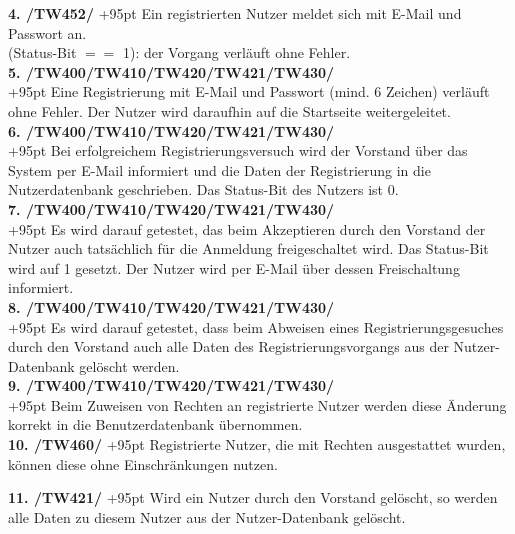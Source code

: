 \documentclass[fontsize = 12pt, paper = a4]{scrreprt}
\begin{document}
\textbf{4. /TW452/}
\hangindent+95pt 
\hspace*{5.5mm}
Ein registrierten Nutzer meldet sich mit E-Mail und Passwort an.\\ (Status-Bit $==$ 1): der Vorgang verläuft ohne Fehler.\\
 
\textbf{5. /TW400/TW410/TW420/TW421/TW430/}\\
\hangindent+95pt 
Eine Registrierung mit E-Mail und Passwort (mind. 6 Zeichen) verläuft ohne Fehler. Der Nutzer wird daraufhin auf die Startseite weitergeleitet.\\

\textbf{6. /TW400/TW410/TW420/TW421/TW430/}\\
\hangindent+95pt 
Bei erfolgreichem Registrierungsversuch wird der Vorstand über das System per E-Mail  informiert und die Daten der Registrierung in die Nutzerdatenbank geschrieben. Das Status-Bit des Nutzers ist 0.\\

\textbf{7. /TW400/TW410/TW420/TW421/TW430/}\\
\hangindent+95pt 
Es wird darauf getestet, das beim Akzeptieren durch den Vorstand der Nutzer auch tatsächlich für die Anmeldung freigeschaltet wird. Das Status-Bit wird auf 1 gesetzt. Der Nutzer wird per E-Mail über dessen Freischaltung informiert. \\

\textbf{8. /TW400/TW410/TW420/TW421/TW430/}\\
\hangindent+95pt 
Es wird darauf getestet, dass beim Abweisen eines Registrierungsgesuches durch den Vorstand auch alle Daten des Registrierungsvorgangs aus der Nutzer-Datenbank gelöscht werden. \\

\textbf{9. /TW400/TW410/TW420/TW421/TW430/}\\
\hangindent+95pt 
Beim Zuweisen von Rechten an registrierte Nutzer werden diese Änderung korrekt in die Benutzerdatenbank übernommen.\\

\textbf{10. /TW460/}
\hangindent+95pt 
\hspace*{3.5mm}
Registrierte Nutzer, die mit Rechten ausgestattet wurden, können diese ohne Einschränkungen nutzen. \\

\newpage

\textbf{11. /TW421/}
\hangindent+95pt 
\hspace*{3.5mm}
Wird ein Nutzer durch den Vorstand gelöscht, so werden alle Daten zu diesem Nutzer aus der Nutzer-Datenbank gelöscht.\\
\end{document}
